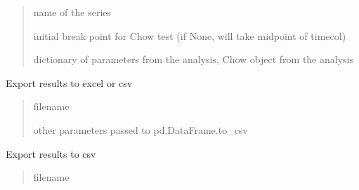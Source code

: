 \documentclass[letterpaper,10pt,english]{sphinxmanual}
\begin{document}
\begin{fulllineitems}
\begin{fulllineitems}
\begin{quote}
\begin{description}
\sphinxAtStartPar
name of the series

\sphinxAtStartPar
initial break point for Chow test (if None, will take midpoint of timecol)

\sphinxAtStartPar
dictionary of parameters from the analysis, Chow object from the analysis

\end{description}\end{quote}

\end{fulllineitems}


\begin{fulllineitems}
\label{\detokenize{source/chowclassifier:chowclassifier.chow.ChewData.save_to_file}}
\pysigstartsignatures
{}
\pysigstopsignatures
\sphinxAtStartPar
Export results to excel or csv
\begin{quote}\begin{description}
\sphinxAtStartPar
filename

\sphinxAtStartPar
other parameters passed to pd.DataFrame.to\_csv

\end{description}\end{quote}

\end{fulllineitems}


\begin{fulllineitems}
\label{\detokenize{source/chowclassifier:chowclassifier.chow.ChewData.to_csv}}
\pysigstartsignatures
{}
\pysigstopsignatures
\sphinxAtStartPar
Export results to csv
\begin{quote}\begin{description}
\sphinxAtStartPar
filename


\end{description}
\end{quote}
\end{fulllineitems}
\end{fulllineitems}
\end{document}

